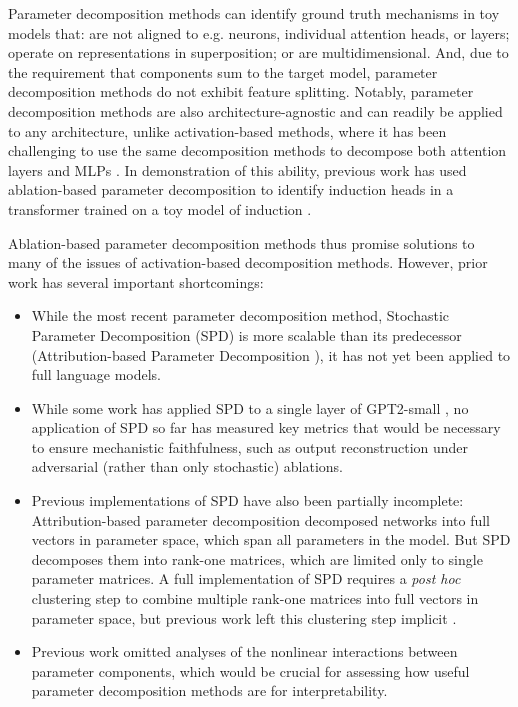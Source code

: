\documentclass{article}
\begin{document}
Parameter decomposition methods can identify ground truth mechanisms in toy models that: are not aligned to e.g. neurons, individual attention heads, or layers; operate on representations in superposition; or are multidimensional. And, due to the requirement that components sum to the target model, parameter decomposition methods do not exhibit feature splitting. Notably, parameter decomposition methods are also architecture-agnostic and can readily be applied to any architecture, unlike activation-based methods, where it has been challenging to use the same decomposition methods to decompose both attention layers and MLPs \cite{kamath2025tracing, ameisen2025circuit, wynroe2024decomposing, ge2024localglobal}. In demonstration of this ability, previous work has used ablation-based parameter decomposition to identify induction heads in a transformer trained on a toy model of induction \cite{christensen2025decomposition}. 

Ablation-based parameter decomposition methods thus promise solutions to many of the issues of activation-based decomposition methods. However, prior work has several important shortcomings: 
\begin{itemize}
    \item While the most recent parameter decomposition method, Stochastic Parameter Decomposition (SPD)\cite{bushnaq2025spd} is more scalable than its predecessor (Attribution-based Parameter Decomposition \cite{braun2024identifying}), it has not yet been applied to full language models. 
    \item While some work has applied SPD to a single layer of GPT2-small \cite{christensen2025decomposition}, no application of SPD so far has measured key metrics that would be necessary to ensure mechanistic faithfulness, such as output reconstruction under adversarial (rather than only stochastic) ablations.
    \item Previous implementations of SPD have also been partially incomplete: Attribution-based parameter decomposition \cite{braun2025interpretabilityparameterspaceminimizing} decomposed networks into full vectors in parameter space, which span all parameters in the model. But SPD decomposes them into rank-one matrices, which are limited only to single parameter matrices. A full implementation of SPD requires a \textit{post hoc} clustering step to combine multiple rank-one matrices into full vectors in parameter space, but previous work left this clustering step implicit \cite{bushnaq2025spd}.
    \item Previous work omitted analyses of the nonlinear interactions between parameter components, which would be crucial for assessing how useful parameter decomposition methods are for interpretability.  
\end{itemize}
\end{document}
